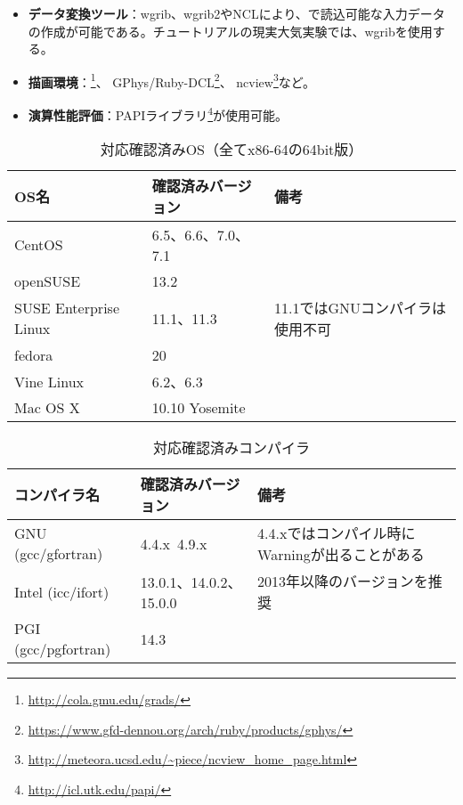\begin{itemize}
  \item {\bf データ変換ツール}：wgrib、wgrib2やNCLにより、\scalerm で読込可能な入力データの作成が可能である。チュートリアルの現実大気実験では、wgribを使用する。
  \item {\bf 描画環境}：\grads \footnote{\url{http://cola.gmu.edu/grads/}}、
GPhys/Ruby-DCL\footnote{\url{https://www.gfd-dennou.org/arch/ruby/products/gphys/}}、
ncview\footnote{\url{http://meteora.ucsd.edu/~piece/ncview\_home\_page.html}}など。
  \item {\bf 演算性能評価}：PAPIライブラリ\footnote{\url{http://icl.utk.edu/papi/}}が使用可能。
\end{itemize}


\begin{table}[htb]
\begin{center}
\caption{対応確認済みOS（全てx86-64の64bit版）}
\begin{tabularx}{150mm}{|l|l|X|} \hline
 \rowcolor[gray]{0.9} OS名 & 確認済みバージョン & 備考 \\ \hline
 CentOS                & 6.5、6.6、7.0、7.1 &  \\ \hline
 openSUSE              & 13.2               &  \\ \hline
 SUSE Enterprise Linux & 11.1、11.3         & 11.1ではGNUコンパイラは使用不可 \\ \hline
 fedora                & 20                 &  \\ \hline
 Vine Linux            & 6.2、6.3           &  \\ \hline
 Mac OS X              & 10.10 Yosemite     &  \\ \hline
\end{tabularx}
\label{tab:compatible_os}
\end{center}
\end{table}

\begin{table}[htb]
\begin{center}
\caption{対応確認済みコンパイラ}
\begin{tabularx}{150mm}{|l|l|X|} \hline
 \rowcolor[gray]{0.9} コンパイラ名 & 確認済みバージョン & 備考 \\ \hline
 GNU (gcc/gfortran)    & 4.4.x~4.9.x           & 4.4.xではコンパイル時にWarningが出ることがある \\ \hline
 Intel (icc/ifort)     & 13.0.1、14.0.2、15.0.0 & 2013年以降のバージョンを推奨 \\ \hline
 PGI (gcc/pgfortran)   & 14.3                   &  \\ \hline
\end{tabularx}
\label{tab:compatible_compiler}
\end{center}
\end{table}

